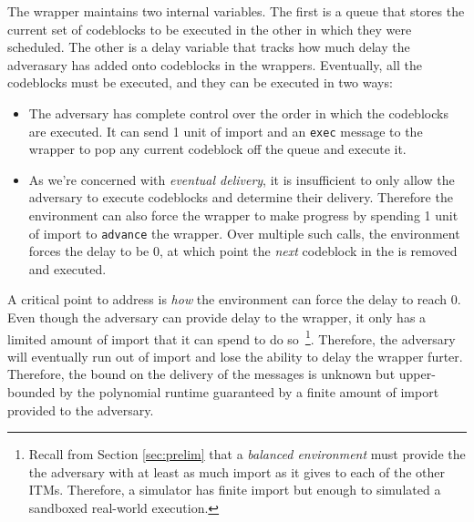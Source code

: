 The wrapper maintains two internal variables.
The first is a queue that stores the current set of codeblocks to be executed in the other in which they were scheduled.
The other is a delay variable that tracks how much delay the adverasary has added onto codeblocks in the wrappers.
Eventually, all the codeblocks must be executed, and they can be executed in two ways:
\begin{itemize}
\item The adversary has complete control over the order in which the codeblocks are executed. 
It can send 1 unit of import and an \texttt{exec} message to the wrapper to pop any current codeblock off the queue and execute it. 
\item As we're concerned with {\em eventual delivery}, it is insufficient to only allow the adversary to execute codeblocks and determine their delivery. 
Therefore the environment can also force the wrapper to make progress by spending 1 unit of import to \texttt{advance} the wrapper.
Over multiple such calls, the environment forces the delay to be 0, at which point the {\em next} codeblock in the  is removed and executed.
\end{itemize}

A critical point to address is {\em how} the environment can force the delay to reach 0.
Even though the adversary can provide delay to the wrapper, it only has a limited amount of import that it can spend to do so~\footnote{Recall from Section \ref{sec:prelim} that a {\em balanced environment} must provide the the adversary with at least as much import as it gives to each of the other ITMs. Therefore, a simulator has finite import but enough to simulated a sandboxed real-world execution.}.
Therefore, the adversary will eventually run out of import and lose the ability to delay the wrapper furter.
Therefore, the bound on the delivery of the messages is unknown but upper-bounded by the polynomial runtime guaranteed by a finite amount of import provided to the adversary.



